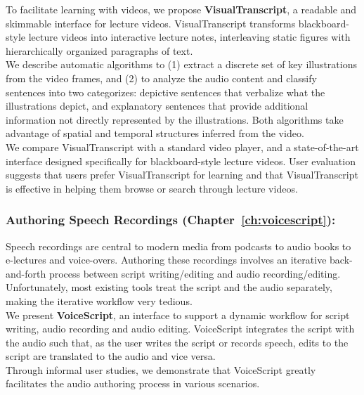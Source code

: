 To facilitate learning with videos, we propose \textbf{VisualTranscript}, a readable and skimmable interface for lecture videos. VisualTranscript transforms blackboard-style lecture videos into interactive lecture notes, interleaving static figures with hierarchically organized paragraphs of text.\\

We describe automatic algorithms to (1) extract a discrete set of key illustrations from the video frames, and (2) to analyze the audio content and classify sentences into two categorizes: depictive sentences that verbalize what the illustrations depict, and explanatory sentences that provide additional information not directly represented by the illustrations. Both algorithms take advantage of spatial and temporal structures inferred from the video.\\

We compare VisualTranscript with a standard video player, and a state-of-the-art interface designed specifically for blackboard-style lecture videos. User evaluation suggests
that users prefer VisualTranscript for learning and that VisualTranscript is
effective in helping them browse or search through lecture videos.\\

\subsubsection*{Authoring Speech Recordings (Chapter~\ref{ch:voicescript}):}
Speech recordings are central to modern media from podcasts
to audio books to e-lectures and voice-overs. Authoring these
recordings involves an iterative back-and-forth process between
script writing/editing and audio recording/editing. Unfortunately, most
existing tools treat the script and the audio separately, making
the iterative workflow very tedious.\\

We present \textbf{VoiceScript}, an interface to support a dynamic workflow for script
writing, audio recording and audio editing. VoiceScript integrates the
script with the audio such that, as the user writes the script or
records speech, edits to the script are translated to the audio
and vice versa.\\

Through informal user studies, we demonstrate that VoiceScript greatly facilitates the audio authoring process in various scenarios.\\

